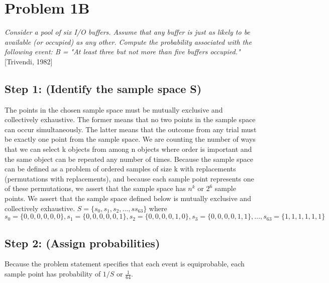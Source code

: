\documentclass[a4paper,10pt]{article}
\title{}
\author{Mark Johnson \\
Loyola University Chicago}
\date {mjohnson4@luc.edu}
\begin{document}
\maketitle

\section{Problem 1B}
\emph{Consider a pool of six I/O buffers. Assume that any buffer is just as likely to be available (or occupied) as 
any other. Compute the probability associated with the following event: \newline
B = "At least three but not more than five buffers occupied."} [Trivendi, 1982]

\subsection{Step 1: (Identify the sample space S)}
The points in the chosen sample space must be mutually exclusive and collectively exhaustive. The former means that 
no two points in the sample space can occur simultaneously. The latter means that the outcome from any trial must be 
exactly one point from the sample space. We are counting the number of ways that we can select k objects from among n 
objects where order is important and the same object can be repeated any number of times. Because the sample space 
can be defined as a problem of ordered samples of size k with replacements (permutations with replacements), and 
because each sample point represents one of these permutations, we assert that the sample space has $ n^{k} $ or $ 2 
^{6} $ sample points. We assert that the sample space defined below is mutually exclusive and collectively 
exhaustive. \newline
$ S = \{s_{0}, s_{1}, s_{2},...,ss_{63}\} $ where \newline
$ s_{0} = \{0,0,0,0,0,0\}, s_{1} = \{0,0,0,0,0,1\}, s_{2} = \{0,0,0,0,1,0\}, s_{3} = \{0,0,0,0,1,1\},...,s_{63} = 
\{1,1,1,1,1,1\} $

\subsection{Step 2: (Assign probabilities)}
Because the problem statement specifies that each event is equiprobable, each sample point has probability of $ 1/S $ 
or $ \frac{1}{64} $.
\end{document}
